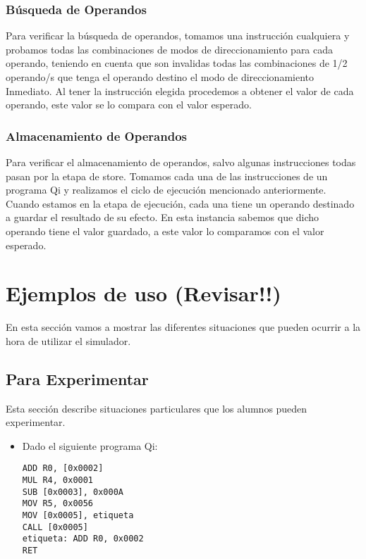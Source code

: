 \begin{enumerate}
\subsubsection{Búsqueda de Operandos}

Para verificar la búsqueda de operandos, tomamos una instrucción cualquiera y probamos todas las combinaciones de modos de direccionamiento para cada operando, teniendo en cuenta que son invalidas todas las combinaciones de 1/2 operando/s que tenga el operando destino el modo de direccionamiento Inmediato. Al tener la instrucción elegida procedemos a obtener el valor de cada operando, este valor se lo compara con el valor esperado. 
 
\subsubsection{Almacenamiento de Operandos}

Para verificar el almacenamiento de operandos, salvo algunas instrucciones todas pasan por la etapa de store.
Tomamos cada una de las instrucciones de un programa Qi y realizamos el ciclo de ejecución mencionado anteriormente.
Cuando estamos en la etapa de ejecución, cada una tiene un operando destinado a guardar el resultado de su efecto.
En esta instancia sabemos que  dicho operando tiene el valor guardado, a este valor lo comparamos con el valor esperado.

\section{Ejemplos de uso (Revisar!!)}

En esta sección vamos a mostrar las diferentes situaciones que pueden ocurrir a la hora de utilizar el simulador.

\subsection{Para Experimentar}

Esta sección describe situaciones particulares que los alumnos pueden experimentar.

\begin{itemize}

\item Dado el siguiente programa Qi:

\begin{verbatim}
ADD R0, [0x0002]
MUL R4, 0x0001
SUB [0x0003], 0x000A
MOV R5, 0x0056
MOV [0x0005], etiqueta
CALL [0x0005]
etiqueta: ADD R0, 0x0002
RET
\end{verbatim}


\end{itemize}
\end{enumerate}

